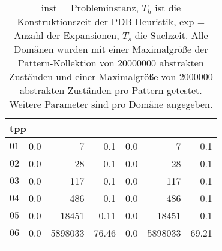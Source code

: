 \begin{longtable}{|c||r|r|r||r|r|r|}
\multicolumn{7}{|l|}{tpp}\\\hline
$01$ & 0.0 & 7 & 0.1 &0.0 & 7 & 0.1 \\\hline
$02$ & 0.0 & 28 & 0.1 &0.0 & 28 & 0.1 \\\hline
$03$ & 0.0 & 117 & 0.1 &0.0 & 117 & 0.1 \\\hline
$04$ & 0.0 & 486 & 0.1 &0.0 & 486 & 0.1 \\\hline
$05$ & 0.0 & 18451 & 0.11 &0.0 & 18451 & 0.1 \\\hline
$06$ & 0.0 & 5898033 & 76.46 &0.0 & 5898033 & 69.21 \\\hline

\caption{inst = Probleminstanz, $T_h$ ist die Konstruktionszeit der PDB-Heuristik, exp = Anzahl der Expansionen, $T_s$
die Suchzeit. Alle Domänen wurden mit einer Maximalgröße der Pattern-Kollektion von $20000000$ abstrakten Zuständen und
einer Maximalgröße von $2000000$ abstrakten Zuständen pro Pattern getestet. Weitere Parameter sind pro Domäne angegeben.}
\end{longtable}